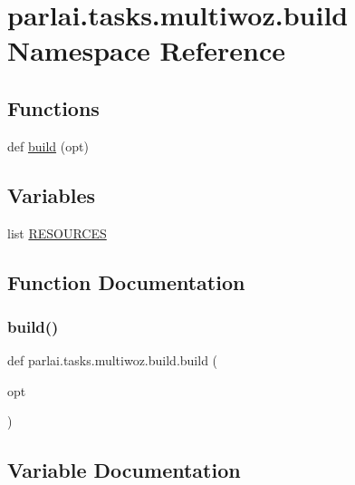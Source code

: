 \hypertarget{namespaceparlai_1_1tasks_1_1multiwoz_1_1build}{}\section{parlai.\+tasks.\+multiwoz.\+build Namespace Reference}
\label{namespaceparlai_1_1tasks_1_1multiwoz_1_1build}
\subsection*{Functions}
\begin{DoxyCompactItemize}
\item 
def \hyperlink{namespaceparlai_1_1tasks_1_1multiwoz_1_1build_acec88589d5259b6f17fad032852ea56a}{build} (opt)
\end{DoxyCompactItemize}
\subsection*{Variables}
\begin{DoxyCompactItemize}
\item 
list \hyperlink{namespaceparlai_1_1tasks_1_1multiwoz_1_1build_adf069bba4bc5748bd257345773c942e9}{R\+E\+S\+O\+U\+R\+C\+ES}
\end{DoxyCompactItemize}


\subsection{Function Documentation}
\mbox{\label{namespaceparlai_1_1tasks_1_1multiwoz_1_1build_acec88589d5259b6f17fad032852ea56a}} 
\subsubsection{\texorpdfstring{build()}{build()}}
{\footnotesize\ttfamily def parlai.\+tasks.\+multiwoz.\+build.\+build (\begin{DoxyParamCaption}\item[{}]{opt }\end{DoxyParamCaption})}



\subsection{Variable Documentation}
\mbox{\label{namespaceparlai_1_1tasks_1_1multiwoz_1_1build_adf069bba4bc5748bd257345773c942e9}} 
